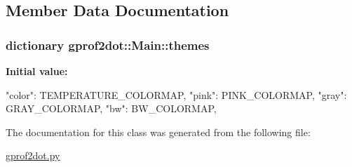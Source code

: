 \subsection{Member Data Documentation}
\hypertarget{classgprof2dot_1_1Main_aca2a8bc399f751f4d4fc0f98a99dd34d}{
\subsubsection[{output}]{}}
\label{classgprof2dot_1_1Main_aca2a8bc399f751f4d4fc0f98a99dd34d}
\hypertarget{classgprof2dot_1_1Main_acc30f2c40e758640966334ea1b0b7168}{
\subsubsection[{profile}]{}}
\label{classgprof2dot_1_1Main_acc30f2c40e758640966334ea1b0b7168}
\hypertarget{classgprof2dot_1_1Main_a0aacbfe50adca4c4235ed59931d2aaf7}{
\subsubsection[{theme}]{}}
\label{classgprof2dot_1_1Main_a0aacbfe50adca4c4235ed59931d2aaf7}
\hypertarget{classgprof2dot_1_1Main_a55b70aa532d4b73a9cf6633ee33a6f1d}{
\subsubsection[{themes}]{\setlength{\rightskip}{0pt plus 5cm}dictionary {\bf gprof2dot::Main::themes}}}
\label{classgprof2dot_1_1Main_a55b70aa532d4b73a9cf6633ee33a6f1d}
{\bfseries Initial value:}
\begin{DoxyCode}
{
            "color": TEMPERATURE_COLORMAP,
            "pink": PINK_COLORMAP,
            "gray": GRAY_COLORMAP,
            "bw": BW_COLORMAP,
    }
\end{DoxyCode}


The documentation for this class was generated from the following file:\begin{DoxyCompactItemize}
\item 
\hyperlink{gprof2dot_8py}{gprof2dot.py}\end{DoxyCompactItemize}
